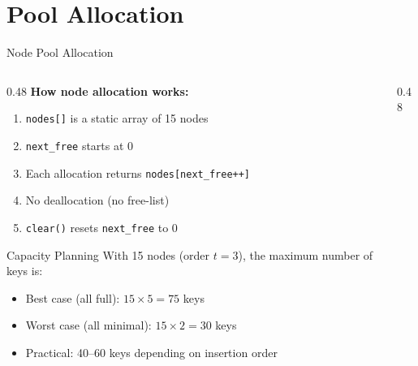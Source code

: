 \documentclass[aspectratio=169, 10pt]{beamer}
\begin{document}
\section{Pool Allocation}

\begin{frame}{Node Pool Allocation}
\begin{columns}[T]
\begin{column}{0.48\textwidth}
\textbf{How node allocation works:}
\begin{enumerate}
  \item \texttt{nodes[]} is a static array of 15 nodes
  \item \texttt{next\_free} starts at 0
  \item Each allocation returns \texttt{nodes[next\_free++]}
  \item No deallocation (no free-list)
  \item \texttt{clear()} resets \texttt{next\_free} to 0
\end{enumerate}

\vspace{0.5em}
\begin{block}{Capacity Planning}
With 15 nodes (order $t=3$), the maximum number of keys is:
\begin{itemize}
  \item Best case (all full): $15 \times 5 = 75$ keys
  \item Worst case (all minimal): $15 \times 2 = 30$ keys
  \item Practical: 40--60 keys depending on insertion order
\end{itemize}
\end{block}
\end{column}

\begin{column}{0.48\textwidth}
\begin{center}
\end{center}
\end{column}
\end{columns}
\end{frame}
\end{document}
